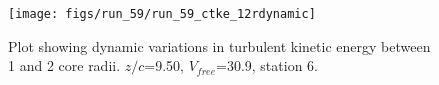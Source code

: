 \begin{figure}[H]
\centering
\texttt{[image: figs/run\_59/run\_59\_ctke\_12rdynamic]}
\caption{Plot showing dynamic variations in turbulent kinetic energy between 1 and 2 core radii. $z/c$=9.50, $V_{free}$=30.9, station 6.}
\label{fig:run_59_ctke_12rdynamic}
\end{figure}


